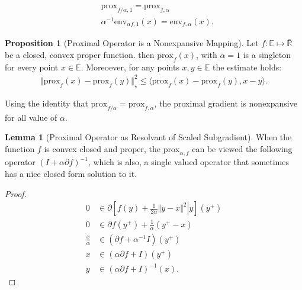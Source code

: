 \documentclass[]{article}
\theoremstyle{definition}
\newtheorem{prop}{Proposition}[section]  %
\newtheorem{lemma}{Lemma}[subsection]  %
\begin{document}
        $$
        \begin{aligned}
            & \text{prox}_{f/\alpha, 1} =  \text{prox}_{f, \alpha}
            \\
            & \alpha^{-1}\text{env}_{\alpha f, 1}(x) = \text{env}_{f, \alpha}(x). 
        \end{aligned}
        $$
        \begin{prop}[Proximal Operator is a Nonexpansive Mapping]
            Let $f:\mathbb E \mapsto \mathbb{\bar R}$ be a closed, convex proper function. then $\text{prox}_f(x)$, with $\alpha= 1$ is a singleton for every point $x\in \mathbb E$. Moreoever, for any points $x, y\in \mathbb E$ the estimate holds: 
            $$
                \begin{aligned}
                    \Vert \text{prox}_f(x) - \text{prox}_f(y)\Vert^2_\star \le 
                    \langle \text{prox}_f(x) - \text{prox}_f(y), x - y\rangle. 
                \end{aligned}
            $$
        \end{prop}
        Using the identity that $\text{prox}_{f/\alpha} = \text{prox}_{f, \alpha}$, the proximal gradient is nonexpansive for all value of $\alpha$. 
        \begin{lemma}[Proximal Operator as Resolvant of Scaled Subgradient]\label{lemma:prox_alternative_form}
            When the function $f$ is convex closed and proper, the $\text{prox}_{\alpha, f}$ can be viewed the following operator $(I + \alpha \partial f)^{-1}$, which is also, a single valued operator that sometimes has a nice closed form solution to it.
        \end{lemma}
        \begin{proof}
            \begin{align*}
                0 &\in \partial\left[
                    \left.
                        f(y) + \frac{1}{2\alpha} \Vert y - x\Vert^2 
                    \right| y
                \right](y^+)
                \\
                0 &\in \partial f(y^+) + \frac{1}{\alpha}(y^+ - x)
                \\
                \frac{x}{\alpha} &\in 
                (\partial f + \alpha^{-1}I)(y^+)
                \\
                x &\in 
                (\alpha \partial f + I)(y^+)
                \\
                y &\in (\alpha\partial f+ I)^{-1}(x).
            \end{align*}
        \end{proof}
\end{document}
